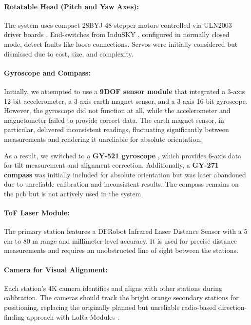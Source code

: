 \paragraph{Rotatable Head (Pitch and Yaw Axes):}
The system uses compact 28BYJ-48 stepper motors controlled via ULN2003 driver boards \cite{angeek_28byj_48}. End-switches from InduSKY \cite{indusky_microswitch}, configured in normally closed mode, detect faults like loose connections. Servos \cite{miuzei_servos} were initially considered but dismissed due to cost, size, and complexity.

\paragraph{Gyroscope and Compass:}

Initially, we attempted to use a \textbf{9DOF sensor module} \citep{jwbl_dof_sensor} that integrated a 3-axis 12-bit accelerometer, a 3-axis earth magnet sensor, and a 3-axis 16-bit gyroscope. However, the gyroscope did not function at all, while the accelerometer and magnetometer failed to provide correct data. The earth magnet sensor, in particular, delivered inconsistent readings, fluctuating significantly between measurements and rendering it unreliable for absolute orientation.

As a result, we switched to a \textbf{GY-521 gyroscope} \cite{azdelivery_gy_521}, which provides 6-axis data for tilt measurement and alignment correction. Additionally, a \textbf{GY-271 compass} \cite{azdelivery_gy_271} was initially included for absolute orientation but was later abandoned due to unreliable calibration and inconsistent results. The compass remains on the \acrshort{pcb} but is not actively used in the system.

\paragraph{ToF Laser Module:}
The primary station features a DFRobot Infrared Laser Distance Sensor \cite{dfrobot_ir_sensor} with a 5 cm to 80 m range and millimeter-level accuracy. It is used for precise distance measurements and requires an unobstructed line of sight between the stations.

\paragraph{Camera for Visual Alignment:}
Each station’s 4K camera \cite{armsom_camera_module} identifies and aligns with other stations during calibration. The cameras should track the bright orange secondary stations for positioning, replacing the originally planned but unreliable radio-based direction-finding approach with LoRa-Modules \cite{tecnoio_lora_modules}.


